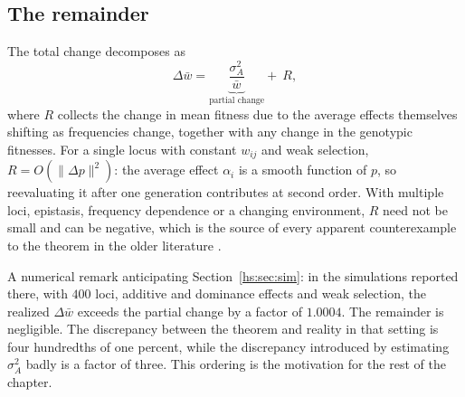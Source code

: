 \subsection{The remainder}

The total change decomposes as
\begin{equation}
\Delta \bar w = \underbrace{\frac{\sigma^2_A}{\bar w}}_{\text{partial change}} + \ R,
\label{hs:eq:decomp}
\end{equation}
where $R$ collects the change in mean fitness due to the average effects themselves shifting as frequencies change, together with any change in the genotypic fitnesses. For a single locus with constant $w_{ij}$ and weak selection, $R = O(\|\Delta p\|^2)$: the average effect $\alpha_i$ is a smooth function of $p$, so reevaluating it after one generation contributes at second order. With multiple loci, epistasis, frequency dependence or a changing environment, $R$ need not be small and can be negative, which is the source of every apparent counterexample to the theorem in the older literature \citep{hs:frank1992fishers}.

A numerical remark anticipating Section~\ref{hs:sec:sim}: in the simulations reported there, with $400$ loci, additive and dominance effects and weak selection, the realized $\Delta\bar w$ exceeds the partial change by a factor of $1.0004$. The remainder is negligible. The discrepancy between the theorem and reality in that setting is four hundredths of one percent, while the discrepancy introduced by estimating $\sigma^2_A$ badly is a factor of three. This ordering is the motivation for the rest of the chapter.

